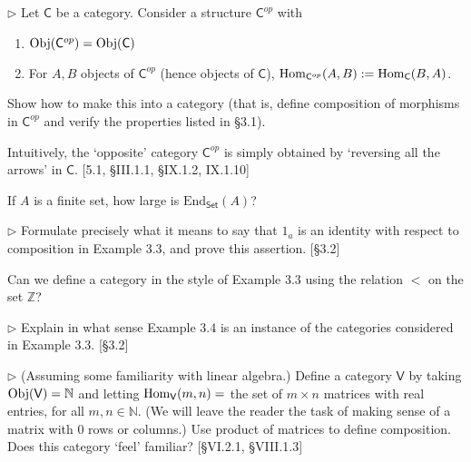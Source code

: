 \begin{problem}
  $\rhd$ Let $\mathsf{C}$ be a category. Consider a structure
  $\mathsf{C}^{op}$ with
  \begin{enumerate}
    \item $\mathrm{Obj}(\mathsf{C}^{op}) = \mathrm{Obj}(\mathsf{C})$
    \item For $A, B$ objects of $\mathsf{C}^{op}$ (hence objects of
    $\mathsf{C}$), $\mathrm{Hom}_{\mathsf{C}^{op}}(A, B) := \mathrm{Hom}_{\mathsf{C}}(B, A)$.
  \end{enumerate}
  Show how to make this into a category (that is, define composition of
  morphisms in $\mathsf{C}^{op}$ and verify the properties listed in \S3.1).

  Intuitively, the `opposite' category $\mathsf{C}^{op}$ is simply obtained
  by `reversing all the arrows' in $\mathsf{C}$. [5.1, \S III.1.1, \S IX.1.2,
  IX.1.10]
\end{problem}

\begin{problem}
  If $A$ is a finite set, how large is $\mathrm{End}_{\mathsf{Set}}(A)$?
\end{problem}

\begin{problem}
  $\rhd$ Formulate precisely what it means to say that $1_a$ is an identity
  with respect to composition in Example 3.3, and prove this assertion.
  [\S3.2]
\end{problem}

\begin{problem}
  Can we define a category in the style of Example 3.3 using the relation
  $<$ on the set $\mathbb{Z}$?
\end{problem}

\begin{problem}
  $\rhd$ Explain in what sense Example 3.4 is an instance of the categories
  considered in Example 3.3. [\S 3.2]
\end{problem}

\begin{problem}
  $\rhd$ (Assuming some familiarity with linear algebra.) Define a category
  $\mathsf{V}$ by taking $\mathrm{Obj}(\mathsf{V}) = \mathbb{N}$ and letting
  $\mathrm{Hom}_{\mathsf{V}}(m,n) = $ the set of $m\times n$ matrices with real
  entries, for all $m,n\in\mathbb{N}$. (We will leave the reader the task of
  making sense of a matrix with 0 rows or columns.) Use product of matrices
  to define composition. Does this category `feel' familiar?
  [\S VI.2.1, \S VIII.1.3]
\end{problem}

